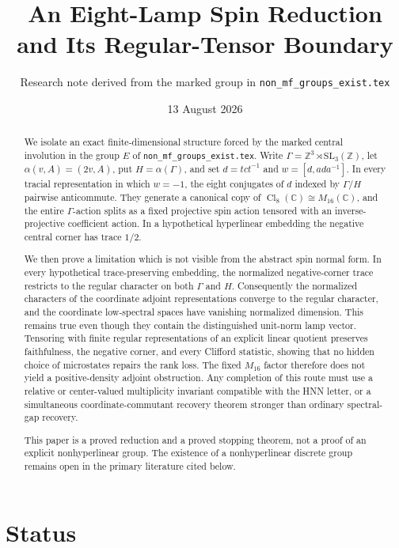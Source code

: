 \documentclass[11pt]{article}
\title{An Eight-Lamp Spin Reduction and Its Regular-Tensor Boundary}
\author{Research note derived from the marked group in
  \texttt{non\_mf\_groups\_exist.tex}}
\date{13 August 2026}
\theoremstyle{definition}
\theoremstyle{remark}
\newcommand{\Z}{\mathbb Z}
\newcommand{\C}{\mathbb C}
\newcommand{\Cl}{\operatorname{Cl}}
\begin{document}
\maketitle

\begin{abstract}
We isolate an exact finite-dimensional structure forced by the marked
central involution in the group $E$ of
\texttt{non\_mf\_groups\_exist.tex}.  Write
$\Gamma=\Z^3\rtimes \mathrm{SL}_3(\Z)$, let
$\alpha(v,A)=(2v,A)$, put $H=\alpha(\Gamma)$, and set
$d=tct^{-1}$ and $w=[d,ada^{-1}]$.  In every tracial representation in
which $w=-1$, the eight conjugates of $d$ indexed by $\Gamma/H$ pairwise
anticommute.  They generate a canonical copy of
$\Cl_8(\C)\cong M_{16}(\C)$, and the entire $\Gamma$-action splits as a
fixed projective spin action tensored with an inverse-projective coefficient
action.  In a hypothetical hyperlinear embedding the negative central
corner has trace $1/2$.

We then prove a limitation which is not visible from the abstract spin
normal form.  In every hypothetical trace-preserving embedding, the
normalized negative-corner trace restricts to the regular character on both
$\Gamma$ and $H$.  Consequently the normalized characters of the coordinate
adjoint representations converge to the regular character, and the
coordinate low-spectral spaces have vanishing normalized dimension.  This
remains true even though they contain the distinguished unit-norm lamp
vector.  Tensoring with finite regular representations of an explicit
linear quotient preserves faithfulness, the negative corner, and every
Clifford statistic, showing that no hidden choice of microstates repairs the
rank loss.  The fixed $M_{16}$ factor therefore does not yield a
positive-density adjoint obstruction.  Any completion of this route must
use a relative or center-valued multiplicity invariant compatible with the
HNN letter, or a simultaneous coordinate-commutant recovery theorem stronger
than ordinary spectral-gap recovery.

This paper is a proved reduction and a proved stopping theorem, not a proof
of an explicit nonhyperlinear group.  The existence of a nonhyperlinear
discrete group remains open in the primary literature cited below.
\end{abstract}

\section{Status}
\end{document}
